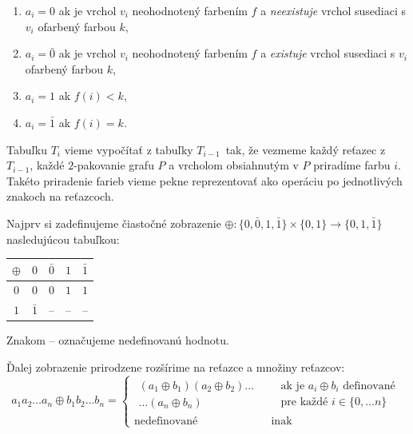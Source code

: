 \begin{enumerate}
    \item $a_i = 0$ ak je vrchol $v_i$ neohodnotený farbením $f$ a \emph{neexistuje} vrchol susediaci s $v_i$ ofarbený farbou $k$,
    \item $a_i = \bar{0}$ ak je vrchol $v_i$ neohodnotený farbením $f$ a \emph{existuje} vrchol susediaci s $v_i$ ofarbený farbou $k$,
    \item $a_i = 1$ ak $f(i) < k$,
    \item $a_i = \bar{1}$ ak $f(i) = k$.
\end{enumerate}

Tabuľku $T_i$ vieme vypočítať z tabuľky $T_{i-1}$ tak, že vezmeme každý reťazec z $T_{i-1}$, každé
$2$-pakovanie grafu $P$ a vrcholom obsiahnutým v $P$ priradíme farbu $i$. Takéto priradenie farieb
vieme pekne reprezentovať ako operáciu po jednotlivých znakoch na reťazcoch.

Najprv si zadefinujeme čiastočné zobrazenie $\oplus : \{ 0, \bar{0}, 1, \bar{1}\} \times \{ 0, 1 \} \rightarrow \{0, 1, \bar{1}\}$
nasledujúcou tabuľkou:

\begin{tabular}{c | c c c c}
    $\oplus$ & $0$ & $\bar{0}$ & $1$ & $\bar{1}$ \\
    \hline
    $0$ & $0$ & $0$ & $1$ & $1$ \\
    $1$ & $\bar{1}$ & -- & -- & -- \\
\end{tabular}

Znakom -- označujeme nedefinovanú hodnotu.

Ďalej zobrazenie prirodzene rozšírime na reťazce a množiny reťazcov:
\begin{equation}
    a_1 a_2 \ldots a_n \oplus b_1 b_2 \ldots b_n =
      \begin{cases}
          \begin{gathered}
            (a_1 \oplus b_1)(a_2 \oplus b_2) \ldots \\
            \ldots (a_n \oplus b_n)  
          \end{gathered} &
          \begin{aligned}
            & \textrm{ak je } a_i \oplus b_i \textrm{ definované} \\ 
            & \textrm{pre každé } i \in \{0, \ldots n\} 
          \end{aligned} \\
        \textrm{nedefinované} & \textrm{ inak}
      \end{cases}
\end{equation}

